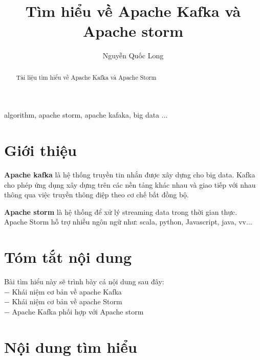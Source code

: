 \documentclass{hcmutarticle}
\begin{document}
\title{Tìm hiểu về Apache Kafka và Apache storm}

\author{  Nguyễn Quốc Long} 



\maketitle



\begin{abstract}
Tài liệu tìm hiểu về Apache Kafka và Apache Storm


\end{abstract}

\begin{keywords}
algorithm, apache storm, apache kafaka, big data  ...
\end{keywords} 


\section{Giới thiệu}

\textbf{Apache kafka} 
là hệ thống truyền tin nhắn được xây dựng cho big data. Kafka
cho phép ứng dụng xây dựng trên các nền tảng khác nhau và giao
tiếp với nhau thông qua việc truyền thông điệp theo cơ chế bất
đồng bộ.

\textbf{Apache storm}
là hệ thống để xử lý streaming data trong thời gian thực. Apache
Storm hỗ trợ nhiều ngôn ngữ như: scala, python, Javascript,
java, vv...

\newpage

\section{Tóm tắt nội dung}\label{survey}
Bài tìm hiểu này sẽ trình bày cá nội dung sau đây: \\
$-$ Khái niệm cơ bản về apache Kafka\\
$-$ Khái niệm cơ bản về apache Storm\\
$-$ Apache Kafka  phối hợp với Apache storm\\
\section{Nội dung tìm hiểu}\label{dev}
\end{document}
